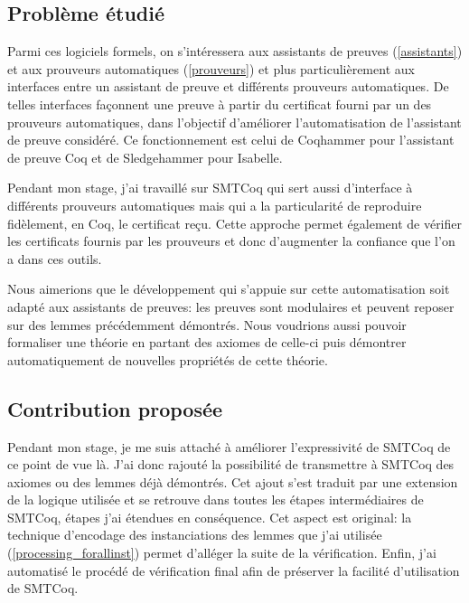 \documentclass[11pt]{article}
\begin{document}
\subsection{Problème étudié}

Parmi ces logiciels formels, on s'intéressera aux assistants de preuves (\ref{assistants}) et aux prouveurs automatiques (\ref{prouveurs}) et plus particulièrement aux interfaces entre un assistant de preuve et différents prouveurs automatiques. De telles interfaces façonnent une preuve à partir du certificat fourni par un des prouveurs automatiques, dans l'objectif d'améliorer l'automatisation de l'assistant de preuve considéré. Ce fonctionnement est celui de Coqhammer \cite{coqhammer} pour l'assistant de preuve Coq et de Sledgehammer \cite{sledgehammer_manual} pour Isabelle. \medbreak

Pendant mon stage, j'ai travaillé sur SMTCoq \cite{smtcoq_code, these_keller} qui sert aussi d'interface à différents prouveurs automatiques mais qui a la particularité de reproduire fidèlement, en Coq, le certificat reçu. Cette approche permet également de vérifier les certificats fournis par les prouveurs et donc d'augmenter la confiance que l'on a dans ces outils.\medbreak

Nous aimerions que le développement qui s'appuie sur cette automatisation soit adapté aux assistants de preuves: les preuves sont modulaires et peuvent reposer sur des lemmes précédemment démontrés. Nous voudrions aussi pouvoir formaliser une théorie en partant des axiomes de celle-ci puis démontrer automatiquement de nouvelles propriétés de cette théorie.

\subsection{Contribution proposée}

Pendant mon stage, je me suis attaché à améliorer l'expressivité de SMTCoq de ce point de vue là. J'ai donc rajouté la possibilité de transmettre à SMTCoq des axiomes ou des lemmes déjà démontrés. Cet ajout s'est traduit par une extension de la logique utilisée et se retrouve dans toutes les étapes intermédiaires de SMTCoq, étapes j'ai étendues en conséquence.  Cet aspect est original: la technique d'encodage des instanciations des lemmes que j'ai utilisée (\ref{processing_forallinst}) permet d'alléger la suite de la vérification. Enfin, j'ai automatisé le procédé de vérification final afin de préserver la facilité d'utili\-sation de SMTCoq.
\end{document}
